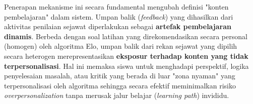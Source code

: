 Penerapan mekanisme ini secara fundamental mengubah definisi "konten pembelajaran" dalam sistem. Umpan balik (\textit{feedback}) yang dihasilkan dari aktivitas penilaian sejawat diperlakukan sebagai \textbf{artefak pembelajaran dinamis}. Berbeda dengan soal latihan yang direkomendasikan secara personal (homogen) oleh algoritma Elo, umpan balik dari rekan sejawat yang dipilih secara heterogen merepresentasikan \textbf{eksposur terhadap konten yang tidak terpersonalisasi}. Hal ini memaksa siswa untuk menghadapi perspektif, logika penyelesaian masalah, atau kritik yang berada di luar "zona nyaman" yang terpersonalisasi oleh algoritma sehingga secara efektif meminimalkan risiko \textit{overpersonalization} tanpa merusak jalur belajar (\textit{learning path}) invididu.